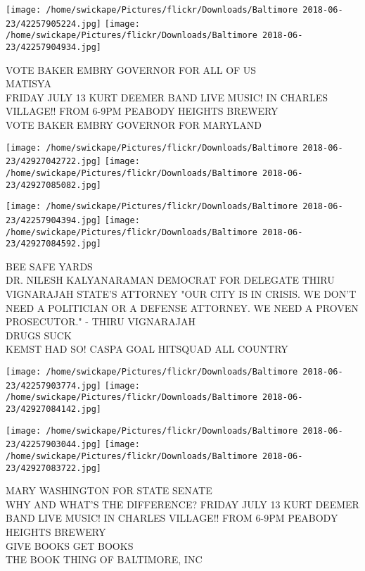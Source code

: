 \documentclass[10pt,letterpaper]{article}
\begin{document}
\texttt{[image: /home/swickape/Pictures/flickr/Downloads/Baltimore 2018-06-23/42257905224.jpg]}
\texttt{[image: /home/swickape/Pictures/flickr/Downloads/Baltimore 2018-06-23/42257904934.jpg]}

VOTE BAKER EMBRY GOVERNOR FOR ALL OF US\\
MATISYA\\
FRIDAY JULY 13 KURT DEEMER BAND LIVE MUSIC!  IN CHARLES VILLAGE!!  FROM 6{-}9PM PEABODY HEIGHTS BREWERY\\
VOTE BAKER EMBRY GOVERNOR FOR MARYLAND\\
\pagebreak

\texttt{[image: /home/swickape/Pictures/flickr/Downloads/Baltimore 2018-06-23/42927042722.jpg]}
\texttt{[image: /home/swickape/Pictures/flickr/Downloads/Baltimore 2018-06-23/42927085082.jpg]}

\texttt{[image: /home/swickape/Pictures/flickr/Downloads/Baltimore 2018-06-23/42257904394.jpg]}
\texttt{[image: /home/swickape/Pictures/flickr/Downloads/Baltimore 2018-06-23/42927084592.jpg]}

BEE SAFE YARDS\\
DR. NILESH KALYANARAMAN DEMOCRAT FOR DELEGATE THIRU VIGNARAJAH STATE'S ATTORNEY "OUR CITY IS IN CRISIS.  WE DON'T NEED A POLITICIAN OR A DEFENSE ATTORNEY.  WE NEED A PROVEN PROSECUTOR." {-} THIRU VIGNARAJAH\\
DRUGS SUCK\\
KEMST HAD SO!  CASPA GOAL HITSQUAD ALL COUNTRY\\
\pagebreak

\texttt{[image: /home/swickape/Pictures/flickr/Downloads/Baltimore 2018-06-23/42257903774.jpg]}
\texttt{[image: /home/swickape/Pictures/flickr/Downloads/Baltimore 2018-06-23/42927084142.jpg]}

\texttt{[image: /home/swickape/Pictures/flickr/Downloads/Baltimore 2018-06-23/42257903044.jpg]}
\texttt{[image: /home/swickape/Pictures/flickr/Downloads/Baltimore 2018-06-23/42927083722.jpg]}

MARY WASHINGTON FOR STATE SENATE\\
WHY AND WHAT'S THE DIFFERENCE?  FRIDAY JULY 13 KURT DEEMER BAND LIVE MUSIC!  IN CHARLES VILLAGE!!  FROM 6{-}9PM PEABODY HEIGHTS BREWERY\\
GIVE BOOKS GET BOOKS\\
THE BOOK THING OF BALTIMORE, INC\\
\pagebreak
\end{document}
